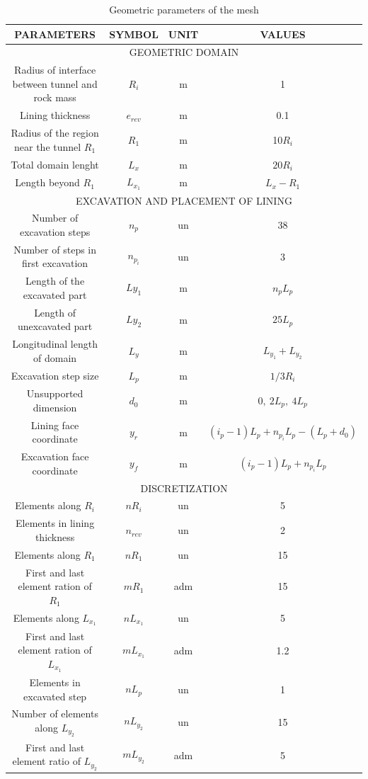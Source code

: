 \documentclass[Journal,letterpaper]{ascelike-new}
\begin{document}
\begin{table}
	\caption{Geometric parameters of the mesh}
	\label{parametros_AXI}
	\centering
	\small
	\renewcommand{\arraystretch}{1.25}
	\begin{tabular}{c c c c}
		\hline
		\multicolumn{1}{c}{\textbf{PARAMETERS}} &
		\multicolumn{1}{c}{\textbf{SYMBOL}} &
		\multicolumn{1}{c}{\textbf{UNIT}} &
		\multicolumn{1}{c}{\textbf{VALUES}} \\
		\hline
		\multicolumn{4}{c}{GEOMETRIC DOMAIN} \\
		\hline
		Radius of interface between tunnel and rock mass & $R_i$ & m & 1 \\		
		Lining thickness & $e_{rev}$ & m & 0.1 \\
		Radius of the region near the tunnel $R_1$ & $R_1$ & m & 10$R_{i}$ \\
		Total domain lenght & $L_{x}$ & m & $20R_i$ \\		
		Length beyond $R_1$ & $L_{x_1}$ & m & $L_x - R_1$ \\							
		\hline
		\multicolumn{4}{c}{EXCAVATION AND PLACEMENT OF LINING} \\
		\hline
		Number of excavation steps & $n_p$ & un & 38 \\
		Number of steps in first excavation & $n_{p_i}$ & un & 3 \\
		Length of the excavated part & $Ly_{1}$ & m & $n_pL_p$ \\
		Length of unexcavated part & $Ly_{2}$ & m & $25L_p$ \\
		Longitudinal length of domain & $L_y$ & m & $L_{y_1}+L_{y_2}$ \\
		Excavation step size & $L_{p}$ & m & $1/3R_{i}$ \\
		Unsupported dimension & $d_0$ & m & $0,~2L_{p},~4L_{p}$ \\
		Lining face coordinate & $y_r$ & m & $(i_p-1)L_p + n_{p_i}L_p - (L_p+d_0)$ \\
		Excavation face coordinate & $y_f$ & m & $(i_p-1)L_p + n_{p_i}L_p$ \\
		\hline
		\multicolumn{4}{c}{DISCRETIZATION} \\
		\hline
		Elements along $R_i$ & $nR_{i}$ & un & 5 \\	
		Elements in lining thickness & $n_{rev}$ & un & 2 \\			
		Elements along $R_1$ & $nR_{1}$ & un & 15 \\	
		First and last element ration of $R_1$ & $mR_{1}$ & adm & 15 \\	
		Elements along $L_{x_1}$ & $nL_{x_1}$ & un & 5 \\
		First and last element ration of $L_{x_1}$ & $mL_{x_1}$ & adm & 1.2 \\				
		Elements in excavated step & $nL_{p}$ & un & 1 \\	
		Number of elements along $L_{y_2}$ & $nL_{y_2}$ & un & 15 \\			
		First and last element ratio of $L_{y_2}$ & $mL_{y_2}$ & adm & 5 \\				
		\hline
	\end{tabular}
	\normalsize
\end{table}
\end{document}
